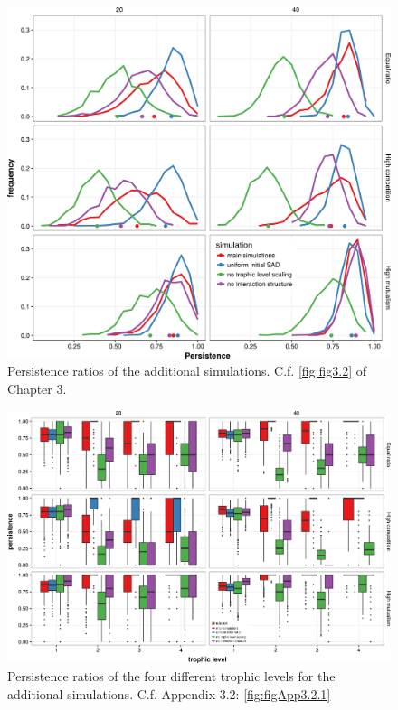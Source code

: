 \begin{figure}[!ht]
\centering
\includegraphics[width=\textwidth]{./Figures/Appendix3_3/Fig_1.png}
\caption[Persistence levels of additional simulations]{\color{Gray} Persistence ratios of the additional simulations. C.f. \cref{fig:fig3.2} of Chapter 3.}
\label{fig:figApp3.3.1}
\end{figure}

\begin{figure}[!htb]
\centering
\includegraphics[width=\textwidth]{./Figures/Appendix3_3/Fig_2.png}
\caption[Persistence levels of additional simulations by trophic level]{\color{Gray} Persistence ratios of the four different trophic levels for the additional simulations. C.f. Appendix 3.2: \cref{fig:figApp3.2.1}}
\label{fig:figApp3.3.2}
\end{figure}

